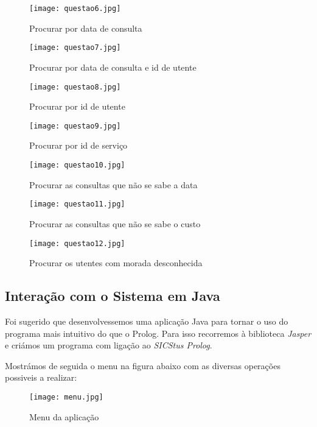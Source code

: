 \begin{figure}[<+ht+>]
	\centering
	\texttt{[image: questao6.jpg]}
	\caption{Procurar por data de consulta}
\end{figure}

\begin{figure}[<+ht+>]
	\centering
	\texttt{[image: questao7.jpg]}
	\caption{Procurar por data de consulta e id de utente}
\end{figure}


\begin{figure}[<+ht+>]
	\centering
	\texttt{[image: questao8.jpg]}
	\caption{Procurar por id de utente}
\end{figure}

\begin{figure}[<+ht+>]
	\centering
	\texttt{[image: questao9.jpg]}
	\caption{Procurar por id de serviço}
\end{figure}

\begin{figure}[<+ht+>]
	\centering
	\texttt{[image: questao10.jpg]}
	\caption{Procurar as consultas que não se sabe a data}
\end{figure}

\begin{figure}[<+ht+>]
	\centering
	\texttt{[image: questao11.jpg]}
	\caption{Procurar as consultas que não se sabe o custo}
\end{figure}

\begin{figure}[<+ht+>]
	\centering
	\texttt{[image: questao12.jpg]}
	\caption{Procurar os utentes com morada desconhecida}
\end{figure}



\clearpage

\subsection{Interação com o Sistema em Java}
Foi sugerido que desenvolvessemos uma aplicação Java para tornar o uso do programa mais intuitivo do que o Prolog. Para isso recorremos à biblioteca \textit{Jasper} e criámos um programa com ligação ao \textit{SICStus Prolog}. 

Mostrámos de seguida o menu na figura abaixo com as diversas operações possiveis a realizar: 

\begin{figure}[<+h+>]
	\centering
	\texttt{[image: menu.jpg]}
	\caption{Menu da aplicação}
\end{figure}




